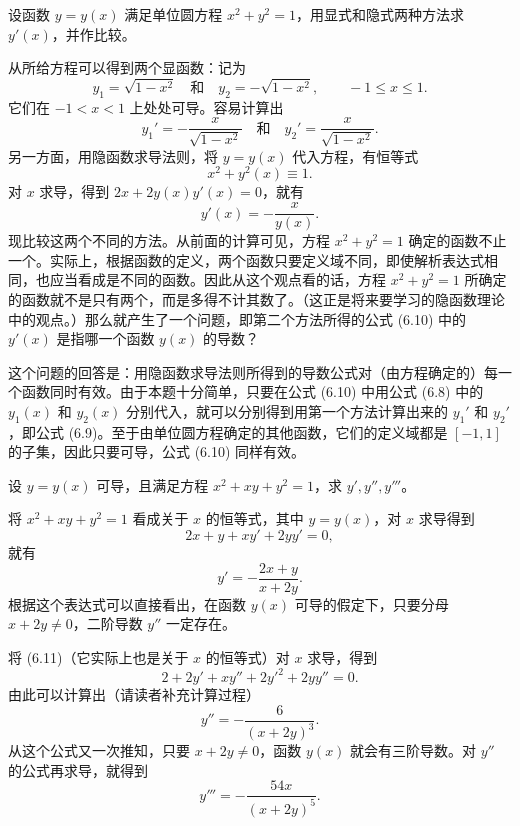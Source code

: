 \begin{xexample}[6.2.7]
设函数 $y=y(x)$ 满足单位圆方程 $x^2+y^2=1$，用显式和隐式两种方法求 $y'(x)$，并作比较。
\end{xexample}
\begin{xsolution}
从所给方程可以得到两个显函数：记为
\begin{equation}
  y_1=\sqrt{1-x^2}\quad\text{和}\quad y_2=-\sqrt{1-x^2},\qquad -1\le x\le1.
  \tag{6.8}
  \label{eq:6.8}
\end{equation}
它们在 $-1<x<1$ 上处处可导。容易计算出
\begin{equation}
  y_1'=-\frac{x}{\sqrt{1-x^2}}\quad\text{和}\quad
  y_2'=\frac{x}{\sqrt{1-x^2}}.
  \tag{6.9}
  \label{eq:6.9}
\end{equation}
另一方面，用隐函数求导法则，将 $y=y(x)$ 代入方程，有恒等式
\[
  x^2+y^2(x)\equiv1.
\]
对 $x$ 求导，得到 $2x+2y(x)y'(x)=0$，就有
\begin{equation}
  y'(x)=-\frac{x}{y(x)}.
  \tag{6.10}
  \label{eq:6.10}
\end{equation}
现比较这两个不同的方法。从前面的计算可见，方程 $x^2+y^2=1$ 确定的函数不止一个。实际上，根据函数的定义，两个函数只要定义域不同，即使解析表达式相同，也应当看成是不同的函数。因此从这个观点看的话，方程 $x^2+y^2=1$ 所确定的函数就不是只有两个，而是多得不计其数了。（这正是将来要学习的隐函数理论中的观点。）那么就产生了一个问题，即第二个方法所得的公式 (6.10) 中的 $y'(x)$ 是指哪一个函数 $y(x)$ 的导数？

这个问题的回答是：用隐函数求导法则所得到的导数公式对（由方程确定的）每一个函数同时有效。由于本题十分简单，只要在公式 (6.10) 中用公式 (6.8) 中的 $y_1(x)$ 和 $y_2(x)$ 分别代入，就可以分别得到用第一个方法计算出来的 $y_1'$ 和 $y_2'$，即公式 (6.9)。至于由单位圆方程确定的其他函数，它们的定义域都是 $[-1,1]$ 的子集，因此只要可导，公式 (6.10) 同样有效。
\end{xsolution}

\begin{xexample}[6.2.8]
设 $y=y(x)$ 可导，且满足方程 $x^2+xy+y^2=1$，求 $y',y'',y'''$。
\end{xexample}
\begin{xsolution}
将 $x^2+xy+y^2=1$ 看成关于 $x$ 的恒等式，其中 $y=y(x)$，对 $x$ 求导得到
\begin{equation}
  2x+y+xy'+2yy'=0,
  \tag{6.11}
  \label{eq:6.11}
\end{equation}
就有
\[
  y'=-\frac{2x+y}{x+2y}.
\]
根据这个表达式可以直接看出，在函数 $y(x)$ 可导的假定下，只要分母 $x+2y\ne0$，二阶导数 $y''$ 一定存在。

将 (6.11)（它实际上也是关于 $x$ 的恒等式）对 $x$ 求导，得到
\[
  2+2y'+xy''+2y'^2+2yy''=0.
\]
由此可以计算出（请读者补充计算过程）
\[
  y''=-\frac6{(x+2y)^3}.
\]
从这个公式又一次推知，只要 $x+2y\ne0$，函数 $y(x)$ 就会有三阶导数。对 $y''$ 的公式再求导，就得到
\[
  y'''=-\frac{54x}{(x+2y)^5}.
\]
\end{xsolution}

